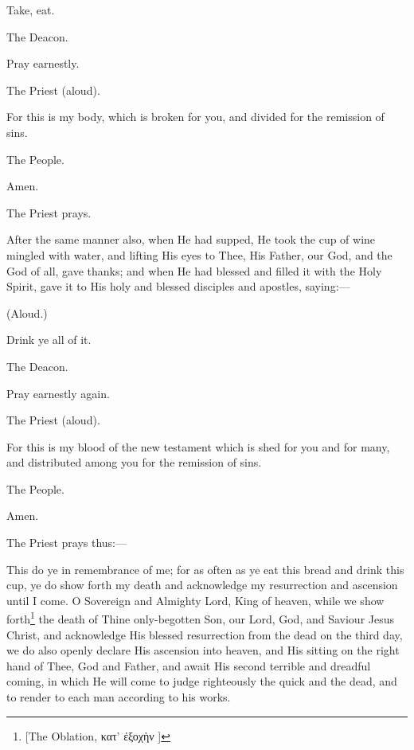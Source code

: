 Take, eat.

The Deacon.

Pray earnestly.

The Priest (aloud).

For this is my body, which is broken for you, and divided for the remission of sins.

The People.

Amen.

The Priest prays.

After the same manner also, when He had supped, He took the cup of wine mingled with water, and lifting His eyes to Thee, His Father, our God, and the God of all, gave thanks; and when He had blessed and filled it with the Holy Spirit, gave it to His holy and blessed disciples and apostles, saying:—

(Aloud.)

Drink ye all of it.

The Deacon.

Pray earnestly again.

The Priest (aloud).

For this is my blood of the new testament which is shed for you and for many, and distributed among you for the remission of sins.

The People.

Amen.

The Priest prays thus:—

This do ye in remembrance of me; for as often as ye eat this bread and drink this cup, ye do show forth my death and acknowledge my resurrection and ascension until I come. O Sovereign and Almighty Lord, King of heaven, while we show forth\footnote{\par{}  [The Oblation, \textgreek{κατ' ἐξοχὴν} ]} the death of Thine only-begotten Son, our Lord, God, and Saviour Jesus Christ, and acknowledge His blessed resurrection from the dead on the third day, we do also openly declare His ascension into heaven, and His sitting on the right hand of Thee, God and Father, and await His second terrible and dreadful coming, in which He will come to judge righteously the quick and the dead, and to render to each man according to his works.

